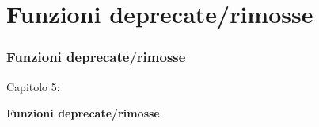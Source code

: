 %

\section{Funzioni deprecate/rimosse}
\begin{frame}[fragile]
	\frametitle{Funzioni deprecate/rimosse}

	\begin{center}\huge{Capitolo 5:}\end{center}
	\begin{center}\huge{\color{typo3darkgrey}\textbf{Funzioni deprecate/rimosse}}\end{center}

\end{frame}


